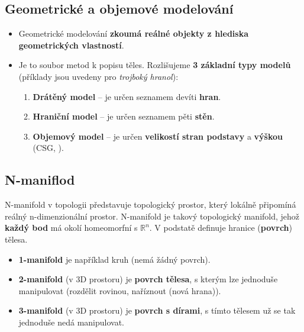 
\subsection{Geometrické a objemové modelování}
\begin{itemize}
	\item Geometrické modelování \textbf{zkoumá reálné objekty z hlediska geometrických vlastností}.
	\item Je to soubor metod k popisu těles. Rozlišujeme \textbf{3 základní typy modelů} (příklady jsou uvedeny pro \textit{trojboký hranol}):
	\begin{enumerate}
		\item \textbf{Drátěný model} --  je určen seznamem devíti \textbf{hran}.
		\item \textbf{Hraniční model} -- je určen seznamem pěti \textbf{stěn}.
		\item \textbf{Objemový model} -- je určen \textbf{velikostí stran podstavy} a \textbf{výškou} (CSG, ).
	\end{enumerate}
\end{itemize}

\subsection{N-maniflod}
N-manifold v topologii představuje topologický prostor, který lokálně připomíná reálný n-dimenzionální prostor. N-manifold je takový topologický manifold, jehož \textbf{každý bod} má okolí homeomorfní s $\mathbb{R}^n$. V podstatě definuje hranice (\textbf{povrch}) tělesa.
\begin{itemize}
\item \textbf{1-manifold} je například kruh (nemá žádný povrch).
\item \textbf{2-manifold} (v 3D prostoru) je \textbf{povrch tělesa}, s kterým lze jednoduše manipulovat (rozdělit rovinou, naříznout (nová hrana)).
\item \textbf{3-manifold} (v 3D prostoru) je \textbf{povrch s dírami}, s tímto tělesem už se tak jednoduše nedá manipulovat.
\end{itemize}

